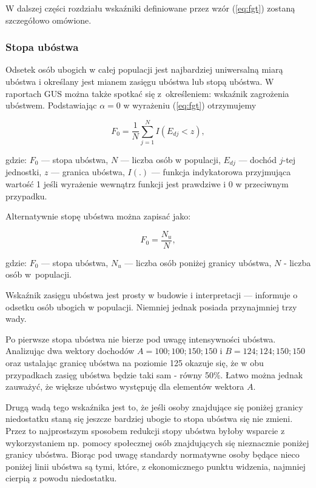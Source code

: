 W dalszej części rozdziału wskaźniki definiowane przez wzór (\ref{eq:fgt}) zostaną szczegółowo omówione.

\subsubsection{Stopa ubóstwa}

Odsetek osób ubogich w całej populacji jest najbardziej uniwersalną miarą ubóstwa i określany jest mianem zasięgu ubóstwa lub stopą ubóstwa. W raportach GUS można także spotkać się z~określeniem: wskaźnik zagrożenia ubóstwem. Podstawiając $\alpha=0$ w wyrażeniu (\ref{eq:fgt}) otrzymujemy 

\begin{equation}
\label{eq:hcr_linia}
F_0=\frac{1}{N}\sum\limits_{j=1}^{N}{I(E_{dj}<z)},
\end{equation}

gdzie: $F_0$ --- stopa ubóstwa, $N$ --- liczba osób w populacji, $E_{dj}$ --- dochód $j$-tej jednostki, $z$ --- granica ubóstwa, $I(.)$ --- funkcja indykatorowa przyjmująca wartość 1 jeśli wyrażenie wewnątrz funkcji jest prawdziwe i 0 w przeciwnym przypadku.

Alternatywnie stopę ubóstwa można zapisać jako:

\begin{equation}
\label{eq:hcr}
F_0=\frac{N_u}{N},
\end{equation}

gdzie: $F_0$ --- stopa ubóstwa, $N_u$ --- liczba osób poniżej granicy ubóstwa, $N$ - liczba osób w~populacji.

Wskaźnik zasięgu ubóstwa jest prosty w budowie i interpretacji --- informuje o odsetku osób ubogich w populacji. Niemniej jednak posiada przynajmniej trzy wady.

Po pierwsze stopa ubóstwa nie bierze pod uwagę intensywności ubóstwa. Analizując dwa wektory dochodów $A={100;100;150;150}$ i $B={124;124;150;150}$ oraz ustalając granicę ubóstwa na poziomie 125 okazuje się, że w obu przypadkach zasięg ubóstwa będzie taki sam - równy 50\%. Łatwo można jednak zauważyć, że większe ubóstwo występuję dla elementów wektora $A$.

Drugą wadą tego wskaźnika jest to, że jeśli osoby znajdujące się poniżej granicy niedostatku staną się jeszcze bardziej ubogie to stopa ubóstwa się nie zmieni. Przez to najprostszym sposobem redukcji stopy ubóstwa byłoby wsparcie z wykorzystaniem np. pomocy społecznej osób znajdujących się nieznacznie poniżej granicy ubóstwa. Biorąc pod uwagę standardy normatywne osoby będące nieco poniżej linii ubóstwa są tymi, które, z ekonomicznego punktu widzenia, najmniej cierpią z powodu niedostatku.

